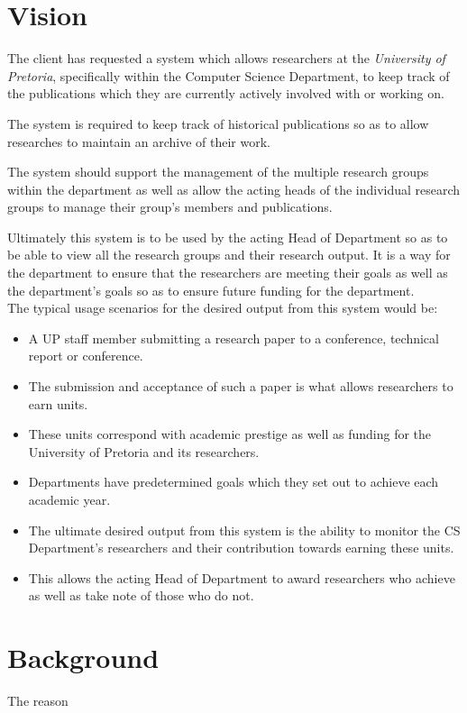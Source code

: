 \documentclass{article}
\begin{document}
	\cleardoublepage	
	\section{Vision}\label{sec:vision}
		The client has requested a system which allows researchers at the \textit{University of Pretoria}, specifically within the Computer Science Department, to keep track of the publications which they are currently actively involved with or working on.
		
		The system is required to keep track of historical publications so as to allow researches to maintain an archive of their work.
		
		The system should support the management of the multiple research groups within the department as well as allow the acting heads of the individual research groups to manage their group's members and publications.
		
		Ultimately this system is to be used by the acting Head of Department so as to be able to view all the research groups and their research output. It is a way for the department to ensure that the researchers are meeting their goals as well as the department's goals so as to ensure future funding for the department.\\
		[5mm]
		The typical usage scenarios for the desired output from this system would be:
		\begin{itemize}
			\item A UP staff member submitting a research paper to a conference, technical report or conference.
			\item The submission and acceptance of such a paper is what allows researchers to earn units.
			\item These units correspond with academic prestige as well as funding for the University of Pretoria and its researchers.
			\item Departments have predetermined goals which they set out to achieve each academic year.
			\item The ultimate desired output from this system is the ability to monitor the CS Department's researchers and their contribution towards earning these units.
			\item This allows the acting Head of Department to award researchers who achieve as well as take note of those who do not.
		\end{itemize}
	\cleardoublepage
	\section{Background}\label{sec:background}
		The reason
		
\end{document}
